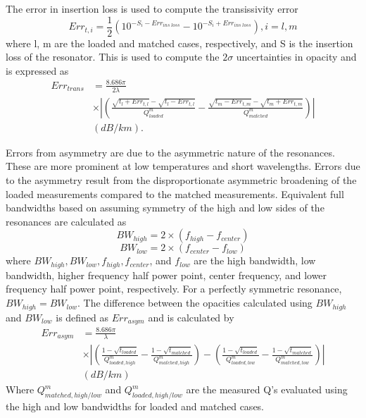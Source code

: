 The error in insertion loss is used to compute the transissivity error
\begin{equation}
Err_{t,i} = \frac{1}{2} ( 10^{-S_i - Err_{ins\;loss}} - 10^{-S_i + Err_{ins\;loss}}) , i=l,m
\end{equation}
where l, m are the loaded and matched cases, respectively, and S is the insertion loss of the resonator. This is used to compute the $2\sigma$ uncertainties in opacity and is expressed as
\begin{equation}
\begin{split}
Err_{trans} &= \frac{8.686 \pi}{2\lambda}\\ 
 &\times \left| \left( \frac{\sqrt{t_l + Err_{t,l}}- \sqrt{t_l - Err_{t,l}}}{Q^m_{loaded}} - \frac{\sqrt{t_m - Err_{t,m}}- \sqrt{t_m + Err_{t,m}}}{Q^m_{matched}} \right) \right|\\
 &(dB/km).
\end{split}
\end{equation}

Errors from asymmetry are due to the asymmetric nature of the resonances. These are more prominent at low temperatures and short wavelengths. Errors due to the asymmetry result from the disproportionate asymmetric broadening of the loaded measurements compared to the matched measurements. Equivalent full bandwidths based on assuming symmetry of the high and low sides of the resonances are calculated as
\begin{equation}
BW_{high} = 2 \times (f_{high} - f_{center})
\end{equation}
\begin{equation}
BW_{low} = 2 \times (f_{center} - f_{low})
\end{equation}
where $BW_{high}, BW_{low}, f_{high}, f_{center}$, and $f_{low}$ are the high bandwidth, low bandwidth, higher frequency half power point, center frequency, and lower frequency half power point, respectively. For a perfectly symmetric resonance, $BW_{high} = BW_{low}$. The difference between the opacities calculated using $BW_{high}$ and $BW_{low}$ is defined as $Err_{asym}$ and is calculated by
\begin{equation}
\begin{split}
Err_{asym} &= \frac{8.686 \pi}{\lambda} 
\\ &\times \left| \left( \frac{1-\sqrt{t_{loaded}}}{Q^m_{loaded,high}} - \frac{1-\sqrt{t_{matched}}}{Q^m_{matched,high}} \right) - \left( \frac{1-\sqrt{t_{loaded}}}{Q^m_{loaded,low}} - \frac{1-\sqrt{t_{matched}}}{Q^m_{matched,low}} \right) \right|\\
 &(dB/km)
\end{split}
\end{equation}
Where $Q^m_{matched,high/low}$ and $Q^m_{loaded,high/low}$ are the measured Q's evaluated using the high and low bandwidths for loaded and matched cases. 

